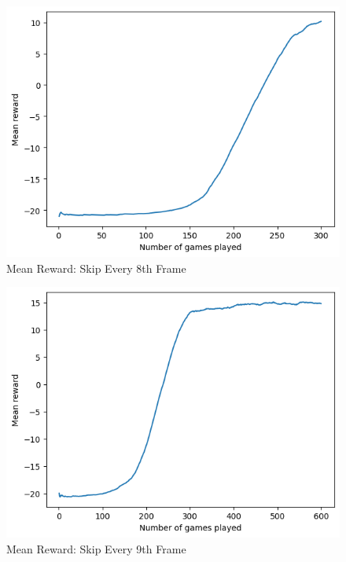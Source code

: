 \documentclass[12pt, a4paper, twocolumn]{article} %
\begin{document}
\begin{figure}[H]
	\includegraphics[width=\linewidth]{mr_sk8.PNG} %
	\caption{Mean Reward: Skip Every 8th Frame} %
\end{figure}

\begin{figure}[H]
	\includegraphics[width=\linewidth]{mr_sk9.PNG} %
	\caption{Mean Reward: Skip Every 9th Frame} %
\end{figure}
\end{document}
